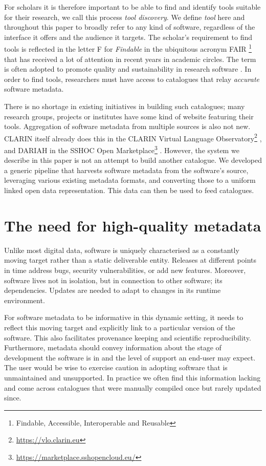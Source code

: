 \documentclass[a4paper,11pt]{article}
\begin{document}
For scholars it is therefore important to be able to find and identify tools suitable for
their research, we call this process \emph{tool discovery}. We define
\emph{tool} here and throughout this paper to broadly refer to any kind of
software, regardless of the interface it offers and the audience it targets.
The scholar's requirement to find tools is reflected in the letter \textsc{F}
for \emph{Findable} in the ubiquitous acronym \textsc{FAIR} \footnote{Findable,
Accessible, Interoperable and Reusable} that has received a lot of attention in
recent years in academic circles. The term is often adopted to promote quality and
sustainability in research software \citep{FAIR}. In order to find tools,
researchers must have access to catalogues that relay \emph{accurate} software
metadata.

There is no shortage in existing initiatives in building such catalogues; many
research groups, projects or institutes have some kind of website featuring
their tools. Aggregation of software metadata from multiple sources is also not
new. CLARIN itself already does this in the CLARIN Virtual Language
Observatory\footnote{\url{https://vlo.clarin.eu}} \citep{VLO}, and DARIAH in
the SSHOC Open Marketplace\footnote{\url{https://marketplace.sshopencloud.eu/}}
. However, the system we describe in this paper is not an attempt to build
another catalogue. We developed a generic pipeline that harvests software
metadata from the software's source, leveraging various existing metadata
formats, and converting those to a uniform linked open data representation.
This data can then be used to feed catalogues.

\section{The need for high-quality metadata}
\label{sec:need}

Unlike most digital data, software is uniquely characterised as a constantly
moving target rather than a static deliverable entity. Releases at different
points in time address bugs, security vulnerabilities, or add new features.
Moreover, software lives not in isolation, but in connection to other software;
its dependencies. Updates are needed to adapt to changes in its runtime
environment.

For software metadata to be informative in this dynamic setting, it needs to
reflect this moving target and explicitly link to a particular version of the
software. This also facilitates provenance keeping and scientific
reproducibility. Furthermore, metadata should convey information about the stage of
development the software is in and the level of support an end-user may expect.
The user would be wise to exercise caution in adopting software that is
unmaintained and unsupported. In practice we often find this information
lacking and come across catalogues that were manually compiled once but rarely
updated since.
\end{document}
